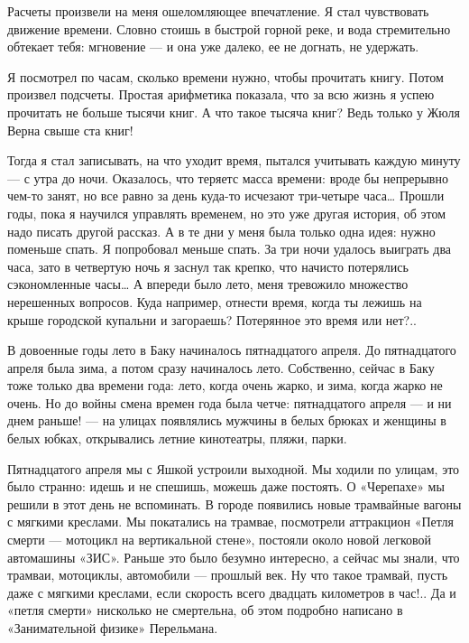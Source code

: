 Расчеты произвели  на меня  ошеломляющее впечатление.  Я стал  чувствовать
движение времени. Словно стоишь в быстрой горной реке, и вода стремительно
обтекает тебя: мгновение — и она уже далеко, ее не догнать, не удержать.

Я посмотрел по часам, сколько времени нужно, чтобы прочитать книгу.  Потом
произвел подсчеты. Простая арифметика показала,  что за всю жизнь я  успею
прочитать не больше тысячи  книг. А что такое  тысяча книг? Ведь только  у
Жюля Верна свыше ста книг!

Тогда я стал  записывать, на  что уходит время,  пытался учитывать  каждую
минуту — с утра  до ночи. Оказалось, что  теряетс масса времени: вроде  бы
непрерывно чем-то занят, но все равно за день куда-то исчезают  три-четыре
часа… Прошли годы, пока я научился  управлять временем, но это уже  другая
история, об этом надо писать другой рассказ. А в те дни у меня была только
одна идея: нужно поменьше  спать. Я попробовал меньше  спать. За три  ночи
удалось выиграть два часа, зато в четвертую ночь я заснул так крепко,  что
начисто потерялись сэкономленные часы… А впереди было лето, меня тревожило
множество нерешенных  вопросов. Куда  например,  отнести время,  когда  ты
лежишь на крыше городской купальни  и загораешь? Потерянное это время  или
нет?..

В  довоенные  годы  лето  в   Баку  начиналось  пятнадцатого  апреля.   До
пятнадцатого апреля была зима, а потом сразу начиналось лето.  Собственно,
сейчас в Баку  тоже только два  времени года: лето,  когда очень жарко,  и
зима, когда жарко  не очень.  Но до войны  смена времен  года была  четче:
пятнадцатого апреля — и ни днем  раньше! — на улицах появлялись мужчины  в
белых брюках  и  женщины в  белых  юбках, открывались  летние  кинотеатры,
пляжи, парки.

Пятнадцатого апреля мы с Яшкой устроили выходной. Мы ходили по улицам, это
было странно: идешь и  не спешишь, можешь даже  постоять. О «Черепахе»  мы
решили в  этот день  не вспоминать.  В городе  появились новые  трамвайные
вагоны с мягкими креслами. Мы покатались на трамвае, посмотрели аттракцион
«Петля смерти  — мотоцикл  на вертикальной  стене», постояли  около  новой
легковой автомашины «ЗИС». Раньше это было безумно интересно, а сейчас  мы
знали, что  трамваи, мотоциклы,  автомобили —  прошлый век.  Ну что  такое
трамвай, пусть  даже  с мягкими  креслами,  если скорость  всего  двадцать
километров в час!.. Да и «петля  смерти» нисколько не смертельна, об  этом
подробно написано в «Занимательной физике» Перельмана.

